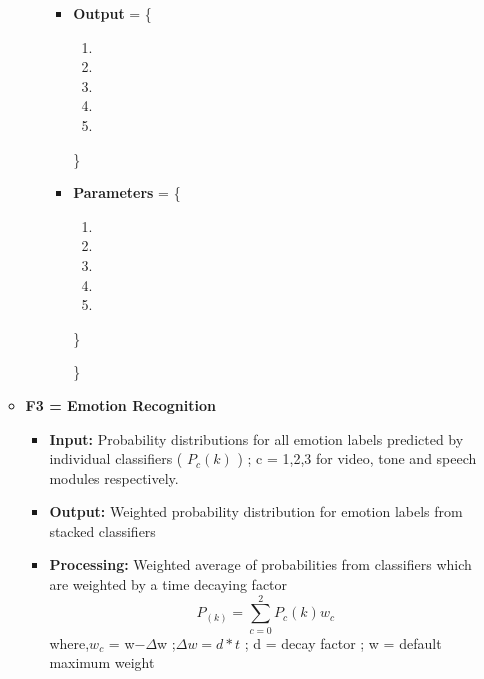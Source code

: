 \documentclass[oneside,a4paper,12pt]{report}
\begin{document}
\begin{normalsize}
\begin{itemize}
\begin{itemize}
\begin{itemize}
\begin{itemize}
		\item \textbf{Output} = \{ 
		\begin{enumerate}
			\item 
			\item
			\item
			\item
			\item
		\end{enumerate}  \}
		
		\item \textbf{Parameters} = \{ 
		\begin{enumerate}
			\item 
			\item
			\item
			\item
			\item
		\end{enumerate}  \}
		
		\}
	\end{itemize}
	\end{itemize}
		
\vspace{4mm}
	\item \textbf{F3 = Emotion Recognition}\\
	\begin{itemize}
		\item \textbf{Input: } Probability distributions for all emotion labels predicted by individual classifiers ( \( P_c(k) \) ) ; c = 1,2,3 for video, tone and speech modules respectively.
		\newline
		\item \textbf{Output: } Weighted probability distribution for emotion labels from stacked classifiers
		\newline
		\item \textbf{Processing: } Weighted average of probabilities from classifiers which are weighted by a time decaying factor
		\begin{equation}
		P_{(k)} = \sum_{c=0}^{2} P_c(k) w_c
		\end{equation}
		where,\newline \(w_c\) = w\( - \Delta\)w ;\newline \(\Delta w = d * t\) ; \newline d = decay factor ; \newline w = default maximum weight
	\end{itemize}
\end{itemize}
\end{itemize}
\newpage



\end{normalsize}
\end{document}
